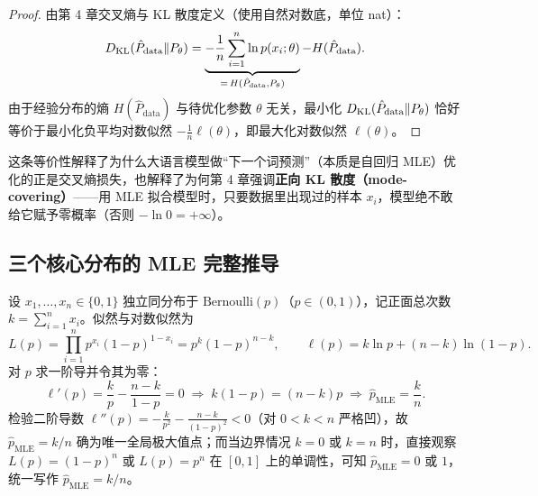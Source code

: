 \begin{proof}
由第 4 章交叉熵与 KL 散度定义（使用自然对数底，单位 nat）：
\[
  D_{\mathrm{KL}}(\hat{P}_{\text{data}} \| P_\theta)
  = \underbrace{-\frac{1}{n}\sum_{i=1}^n \ln p(x_i; \theta)}_{=\, H(\hat{P}_{\text{data}}, P_\theta)} - H(\hat{P}_{\text{data}}).
\]
由于经验分布的熵 $H(\hat{P}_{\text{data}})$ 与待优化参数 $\theta$ 无关，最小化 $D_{\mathrm{KL}}(\hat{P}_{\text{data}} \| P_\theta)$ 恰好等价于最小化负平均对数似然 $-\frac{1}{n}\ell(\theta)$，即最大化对数似然 $\ell(\theta)$。
\end{proof}

这条等价性解释了为什么大语言模型做“下一个词预测”（本质是自回归 MLE）优化的正是交叉熵损失，也解释了为何第 4 章强调\textbf{正向 KL 散度（mode-covering）}——用 MLE 拟合模型时，只要数据里出现过的样本 $x_i$，模型绝不敢给它赋予零概率（否则 $-\ln 0 = +\infty$）。

\subsection{三个核心分布的 MLE 完整推导}
\label{subsec:ch5-mle-examples}

\begin{example}
\label{ex:ch5-mle-bern}
设 $x_1, \dots, x_n \in \{0, 1\}$ 独立同分布于 $\mathrm{Bernoulli}(p)$（$p \in (0,1)$），记正面总次数 $k = \sum_{i=1}^n x_i$。似然与对数似然为
\[
  L(p) = \prod_{i=1}^n p^{x_i}(1-p)^{1-x_i} = p^k (1-p)^{n-k},
  \qquad
  \ell(p) = k\ln p + (n - k)\ln(1 - p).
\]
对 $p$ 求一阶导并令其为零：
\[
  \ell'(p) = \frac{k}{p} - \frac{n - k}{1 - p} = 0
  \;\Longrightarrow\;
  k(1 - p) = (n - k)p
  \;\Longrightarrow\;
  \hat{p}_{\text{MLE}} = \frac{k}{n}.
\]
检验二阶导数 $\ell''(p) = -\frac{k}{p^2} - \frac{n-k}{(1-p)^2} < 0$（对 $0 < k < n$ 严格凹），故 $\hat{p}_{\text{MLE}} = k/n$ 确为唯一全局极大值点；而当边界情况 $k=0$ 或 $k=n$ 时，直接观察 $L(p) = (1-p)^n$ 或 $L(p) = p^n$ 在 $[0,1]$ 上的单调性，可知 $\hat{p}_{\text{MLE}} = 0$ 或 $1$，统一写作 $\hat{p}_{\text{MLE}} = k/n$。
\end{example}

